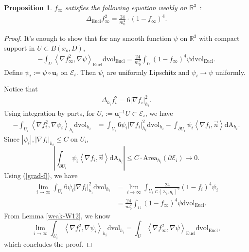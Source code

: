 \documentclass[letter]{amsart}
\newtheorem{prop}[thm]{Proposition}
\theoremstyle{definition}
\theoremstyle{remark}
\def\Area{\mathrm{Area}}
\begin{document}
\begin{prop}
	$f _\infty$ satisfies the following equation weakly on $\mathbb{R}^3$ :
	\begin{align}\label{f2-eq}
\Delta _{\mathrm{Eucl} } f_\infty ^2 = \frac{24}{m_0^2} \cdot (1-f_\infty)^4.
\end{align}
\end{prop}
\begin{proof}
It's enough to show that for any smooth function $\psi $ on $\mathbb{R}^3$ with compact support in $U \subset B(x_o, D) $, 
\begin{align*}
	-\int_{U} \left<\nabla f^2 _\infty, \nabla \psi\right>_{\mathrm{Eucl} } \mathrm{dvol}_{\mathrm{Eucl}} = \frac{24}{m_0^2} \int_{U} (1-f_\infty)^4 \psi \mathrm{dvol}_{\mathrm{Eucl}} .
\end{align*}
Define $\psi _i := \psi \circ \mathbf{u}_i$ on $\mathcal{E}_i$. Then $\psi _i$ are uniformly Lipschitz and $\psi _i \to \psi $ uniformly.

Notice that
\begin{align*}
	\Delta _{h_i}f_i^2 = 6|\nabla f_i|_{h_i}^2.
\end{align*}
Using integration by parts, for $U_i := \mathbf{u}_i^{-1}U \subset \mathcal{E}_i$, we have
\begin{align*}
	-\int_{U_i} \left< \nabla f _i^2, \nabla \psi _i \right>_{h_i} \mathrm{dvol}_{h_i} &= \int_{U_i} 6 \psi _i |\nabla f_i|^2_{h_i} \mathrm{dvol}_{h_i}  - \int_{\partial U_i} \psi _i \left< \nabla f _i, \vec{n} \right> \mathrm{dA}_{h_i}.
\end{align*}
Since $|\psi _i |, |\nabla f _i|_{h_i} \leq C$ on $U_i$,
$$
\left|\int_{\partial U_i} \psi_i \left<\nabla f _i, \vec{n} \right> \mathrm{dA}_{h_i}\right|\leq C\cdot  \Area_{h_i}(\partial \mathcal{E}_i) \to 0.
$$ 
Using (\ref{grad-f}), we have 
\begin{align*}
	\lim_{i\to \infty} \int_{U_i} 6 \psi _i |\nabla f_i|_{h_i}^2 \mathrm{dvol}_{h_i} &= \lim_{i \to \infty} \int_{U_i} \frac{24}{\mathcal{C}(\Sigma _i, g_i)^2} (1-f_i)^{4} \psi _i \\										  &= \frac{24}{m_0^2} \int_{U}(1-f_\infty)^4 \psi \mathrm{dvol}_{\mathrm{Eucl}} .
\end{align*}
From Lemma \ref{weak-W12}, we know 
$$\lim_{i\to \infty} \int_{U_i} \left< \nabla f^2 _i, \nabla \psi _i\right>_{h_i} \mathrm{dvol}_{h_i} = \int_{U} \left< \nabla f^2 _\infty, \nabla \psi\right>_{\mathrm{Eucl}} \mathrm{dvol}_{\mathrm{Eucl}} ,$$
which concludes the proof. 
\end{proof}
\end{document}
